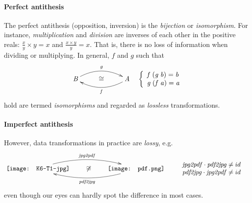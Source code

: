 \documentclass{elsarticle}
\makeatletter
\newcommand{\Conid}[1]{\mathit{#1}}
\newcommand{\Varid}[1]{\mathit{#1}}
\def\arrayin#1{\begin{array}{rcl}#1\end{array}}
\newenvironment{lcbr}{\left\{\begin{array}{l}}{\end{array}\right.}
\def\arrayin#1{\begin{array}{rcl}#1\end{array}}
\def\comp{ \mathbin{\cdot} }
\def\iso{\cong}
\def\arIso#1#2#3#4{\arLaw{#1}{#2}{#3}{#4}\iso}
\def\arLaw#1#2#3#4#5{
\xymatrix{
        #1      \ar@/^1pc/[rr]^-{#4} &
        #5 &
        #2      \ar@/^1pc/[ll]^-{#3}
}}
\def\arLaw#1#2#3#4#5{
\xymatrix{
        #1      \ar@/^1pc/[rr]^-{#4} &
        #5 &
        #2      \ar@/^1pc/[ll]^-{#3}
}}
\def\arIso#1#2#3#4{\arLaw{#1}{#2}{#3}{#4}\iso}
\makeatother
\begin{document}
\paragraph{Perfect antithesis}
The perfect antithesis (opposition, inversion) is the \emph{bijection} or \emph{isomorphism}.
For instance, \emph{multiplication} and \emph{division} are inverses of each other in the positive reals:
\ensuremath{\frac{\Varid{x}}{\Varid{y}} \times \Varid{y}\mathrel{=}\Varid{x}} and \ensuremath{\frac{\Varid{x} \times \Varid{y}}{\Varid{y}}\mathrel{=}\Varid{x}}. That is, there is no loss of information when dividing or multiplying. In general,
\ensuremath{\Varid{f}} and \ensuremath{\Varid{g}} such that
\begin{eqnarray}
        \arIso{\ensuremath{\Conid{B}}}{\ensuremath{\Conid{A}}}{\ensuremath{\Varid{f}}}{\ensuremath{\Varid{g}}}
&&
\ensuremath{\begin{lcbr}\Varid{f}\;(\Varid{g}\;\Varid{b})\mathrel{=}\Varid{b}\\\Varid{g}\;(\Varid{f}\;\Varid{a})\mathrel{=}\Varid{a}\end{lcbr}}
	\label{eq:230206a}
\end{eqnarray}
hold are termed \emph{isomorphisms} and regarded as \emph{lossless} transformations.

\paragraph{Imperfect antithesis}
However, data transformations in practice are \emph{lossy}, e.g.
\begin{eqnarray*}
\xymatrix@C=2em@R=3em{
	\mbox{\texttt{[image: K6-T1-jpg]}}
		\ar@/^1.2pc/[rr]^-{\ensuremath{\Varid{jpg2pdf}}}
&
	\not\cong
&
	\mbox{\texttt{[image: pdf.png]}}
		\ar@/^1.2pc/[ll]^-{\ensuremath{\Varid{pdf2jpg}}}
}
&&
\arrayin{
	&\ensuremath{\Varid{jpg2pdf} \comp \Varid{pdf2jpg}} \not= \ensuremath{{id}}&
\\
	&\ensuremath{\Varid{pdf2jpg} \comp \Varid{jpg2pdf}} \not= \ensuremath{{id}}&
}
\end{eqnarray*}
even though our eyes can hardly spot the difference in most cases.
\end{document}
